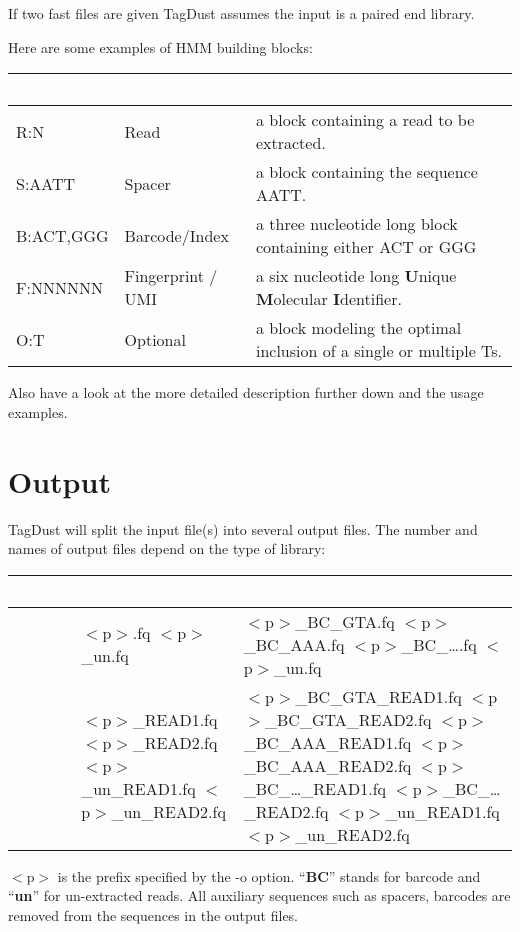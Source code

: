 \documentclass[11pt,a4paper,oneside]{book}
\begin{document}
If two fast files are given TagDust assumes the input is a paired end library.

\vspace{10 mm}


Here are some examples of HMM building blocks:
\begin{center}


\begin{tabular}{| l | l | p{12cm}|}
\hline
\rowcolor{blue} \textcolor{white}{\scshape Example}		&\textcolor{white}{\scshape Type}		&	\textcolor{white}{\scshape Description}\\ \hline
R:N & Read  & a block containing a read to be extracted.\\
S:AATT & Spacer & a block containing the sequence AATT.\\ 
B:ACT,GGG & Barcode/Index & a three nucleotide long block containing either ACT or GGG\\ 
F:NNNNNN & Fingerprint / UMI & a six nucleotide long {\bf U}nique {\bf M}olecular {\bf I}dentifier.\\ 
O:T  & Optional & a block modeling the optimal inclusion of a single or multiple Ts.\\
\hline
\end{tabular}
\end{center}

Also have a look at the more detailed description further down and the usage examples. 


\newpage 
\section{Output}
TagDust will split the input file(s) into several output files. The number and names of output files depend on the type of library: 


\begin{center}
\begin{tabular}{ | c | p{4.5cm} | p{4.5cm}|}
\hline
 \textcolor{white}{\scshape }		&\cellcolor{blue}\textcolor{white}{\scshape No barcodes}		&	\cellcolor{blue}\textcolor{white}{\scshape Barcodes}\\ \hline
\cellcolor{blue}\textcolor{white}{\scshape Single End} & $<$p$>$.fq \newline $<$p$>$\_un.fq & $<$p$>$\_BC\_GTA.fq $<$p$>$\_BC\_AAA.fq $<$p$>$\_BC\_\dots.fq \newline $<$p$>$\_un.fq \\
\cellcolor{blue}\textcolor{white}{\scshape Paired End} &  $<$p$>$\_READ1.fq $<$p$>$\_READ2.fq $<$p$>$\_un\_READ1.fq $<$p$>$\_un\_READ2.fq   & $<$p$>$\_BC\_GTA\_READ1.fq $<$p$>$\_BC\_GTA\_READ2.fq  $<$p$>$\_BC\_AAA\_READ1.fq $<$p$>$\_BC\_AAA\_READ2.fq $<$p$>$\_BC\_\dots\_READ1.fq $<$p$>$\_BC\_\dots\_READ2.fq $<$p$>$\_un\_READ1.fq $<$p$>$\_un\_READ2.fq\\ 
\hline
\end{tabular}
\end{center}
$<$p$>$ is the prefix specified by the -o option. ``{\bf BC}'' stands for barcode and ``{\bf un}'' for un-extracted reads. All auxiliary sequences such as spacers, barcodes are removed from the sequences in the output files. 
\end{document}
